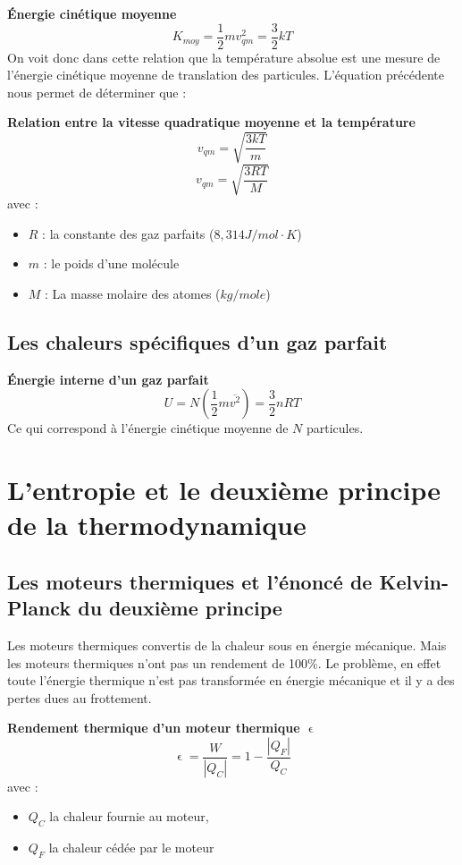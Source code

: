 \documentclass{article}
\begin{document}
\noindent
\textbf{Énergie cinétique moyenne}
\[K_{moy} = \frac{1}{2}mv^2_{qm} = \frac{3}{2}kT\]
On voit donc dans cette relation que la température absolue est une mesure de l'énergie cinétique moyenne de translation des particules.
\newline
L'équation précédente nous permet de déterminer que :
\newline

\noindent
\textbf{Relation entre la vitesse quadratique moyenne et la température}
\[v_{qm} = \sqrt{\frac{3kT}{m}}\]
\[v_{qm} = \sqrt{\frac{3RT}{M}}\]
avec :
\begin{itemize}
    \item $R$ : la constante des gaz parfaits ($8,314J/mol\cdot K$)
    \item $m$ : le poids d'une molécule
    \item $M$ : La masse molaire des atomes ($kg/mole$)
\end{itemize}

\subsection{Les chaleurs spécifiques d'un gaz parfait}
\textbf{Énergie interne d'un gaz parfait}
\[U = N(\frac{1}{2}m\overline{v^2}) = \frac{3}{2}nRT \]
Ce qui correspond à l'énergie cinétique moyenne de $N$ particules.

\section{L'entropie et le deuxième principe de la thermodynamique}
\subsection{Les moteurs thermiques et l'énoncé de Kelvin-Planck du deuxième principe}
Les moteurs thermiques convertis de la chaleur sous en énergie mécanique. Mais les moteurs thermiques n'ont pas un rendement de 100\%. Le problème, en effet toute l'énergie thermique n'est pas transformée en énergie mécanique et il y a des pertes dues au frottement.
\newline

\noindent
\textbf{Rendement thermique d'un moteur thermique $\upvarepsilon$}
\[\upvarepsilon = \frac{W}{|Q_C|} = 1 - \frac{|Q_F|}{Q_C}\]
avec :
\begin{itemize}
    \item $Q_C$ la chaleur fournie au moteur,
    \item $Q_F$ la chaleur cédée par le moteur
\end{itemize}
\newline
\end{document}
